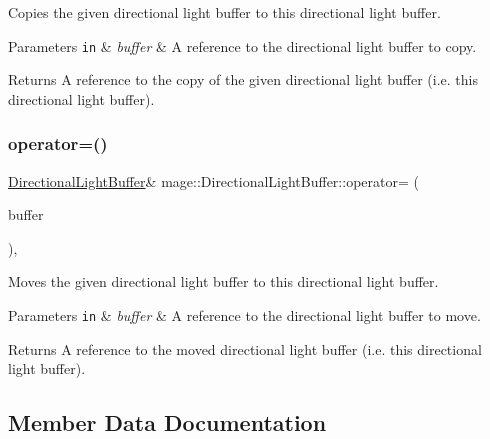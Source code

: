 Copies the given directional light buffer to this directional light buffer.


\begin{DoxyParams}[1]{Parameters}
\mbox{\tt in}  & {\em buffer} & A reference to the directional light buffer to copy. \\
\hline
\end{DoxyParams}
\begin{DoxyReturn}{Returns}
A reference to the copy of the given directional light buffer (i.\+e. this directional light buffer). 
\end{DoxyReturn}
\hypertarget{structmage_1_1_directional_light_buffer_a2985b19fcdaa4ed6d0e0b07a563bee21}{}\label{structmage_1_1_directional_light_buffer_a2985b19fcdaa4ed6d0e0b07a563bee21} 
\subsubsection{\texorpdfstring{operator=()}{operator=()}\hspace{0.1cm}{\footnotesize\ttfamily [2/2]}}
{\footnotesize\ttfamily \hyperlink{structmage_1_1_directional_light_buffer}{Directional\+Light\+Buffer}\& mage\+::\+Directional\+Light\+Buffer\+::operator= (\begin{DoxyParamCaption}\item[{\hyperlink{structmage_1_1_directional_light_buffer}{Directional\+Light\+Buffer} \&\&}]{buffer }\end{DoxyParamCaption})\hspace{0.3cm}{\ttfamily [default]}, {\ttfamily [noexcept]}}

Moves the given directional light buffer to this directional light buffer.


\begin{DoxyParams}[1]{Parameters}
\mbox{\tt in}  & {\em buffer} & A reference to the directional light buffer to move. \\
\hline
\end{DoxyParams}
\begin{DoxyReturn}{Returns}
A reference to the moved directional light buffer (i.\+e. this directional light buffer). 
\end{DoxyReturn}


\subsection{Member Data Documentation}
\hypertarget{structmage_1_1_directional_light_buffer_a9f7b75a474c2f28176aeb5207ff653dd}{}\label{structmage_1_1_directional_light_buffer_a9f7b75a474c2f28176aeb5207ff653dd} 
